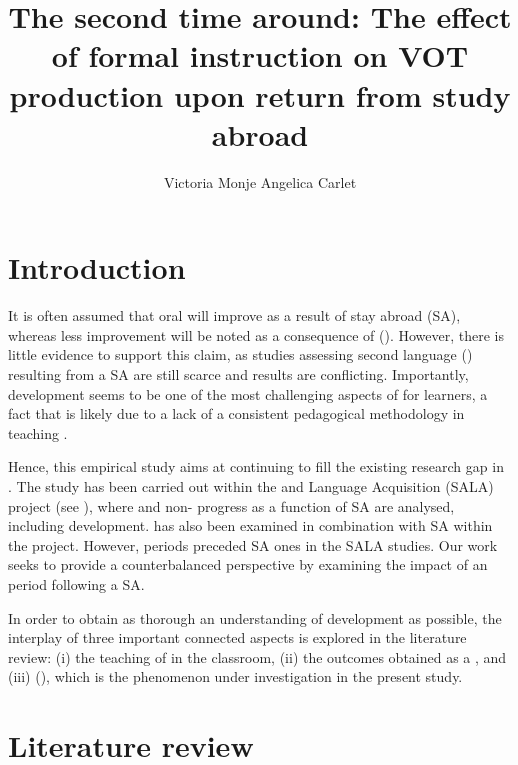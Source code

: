 \documentclass[output=paper]{langsci/langscibook}
\author{Victoria Monje\affiliation{Universitat Pompeu Fabra}\lastand
Angelica Carlet\affiliation{Universitat Internacional de Catalunya}}
\title{The second time around: The effect of formal instruction on VOT production upon return from study abroad}
\begin{document}
\section{Introduction}


It is often assumed that  oral  will improve as a result of stay abroad (SA), whereas less improvement will be noted as a consequence of  (). However, there is little evidence to support this claim, as studies assessing second language ()   resulting from a SA are still scarce and results are conflicting. Importantly,  development seems to be one of the most challenging aspects of   for learners, a fact that is likely due to a lack of a consistent pedagogical methodology in teaching \citep{DarcyEtAl2012}. 



Hence, this empirical study aims at continuing to fill the existing research gap in  . The study has been carried out within the  and Language Acquisition (SALA) project (see \citealt{Pérez-Vidal2014}), where  and non- progress as a function of SA are analysed, including   development.  has also been examined in combination with SA within the project. However,  periods preceded SA ones in the SALA studies. Our work seeks to provide a counterbalanced perspective by examining the impact of an  period following a SA.



In order to obtain as thorough an understanding of   development as possible, the interplay of three important connected aspects is explored in the literature review: (i) the teaching of  in the classroom, (ii) the  outcomes obtained as a , and (iii)  (), which is the phenomenon under investigation in the present study. 



\section{Literature review} 
\end{document}
